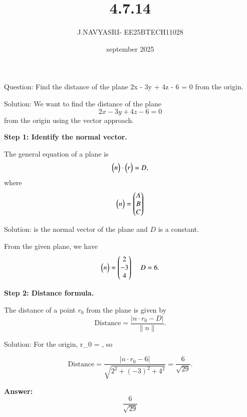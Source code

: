 \documentclass{beamer}
\title %
{4.7.14}
\date{september 2025}
\author %
{J.NAVYASRI- EE25BTECH11028}
\begin{document}
\frame{\titlepage}
\begin{frame}{Question:}
Find the distance of the plane 
2x - 3y + 4z - 6 = 0
from the origin.
\end{frame}

\begin{frame}{Solution:}
 We want to find the distance of the plane 
\begin{equation}
2x - 3y + 4z - 6 = 0
\end{equation} 
from the origin using the vector approach.

\textbf{Step 1: Identify the normal vector.}

The general equation of a plane is 
\begin{equation}
\begin{pmatrix}n\end{pmatrix} \cdot \begin{pmatrix}r\end{pmatrix} = D,
\end{equation}
where 
\begin{equation}
\begin{pmatrix}n\end{pmatrix} = \begin{pmatrix} A \\ B \\ C \end{pmatrix}
\end{equation} 
\end{frame}

\begin{frame}{Solution:}
is the normal vector of the plane and \(D\) is a constant. 

From the given plane, we have
\begin{equation}
\begin{pmatrix}n\end{pmatrix} = \begin{pmatrix} 2 \\ -3 \\ 4\end{pmatrix} \, \quad D = 6.
\end{equation}

\textbf{Step 2: Distance formula.}

The distance of a point \(r_0\) from the plane is given by
\begin{equation}
\text{Distance} = \frac{|{n} \cdot {r}_0 - D|}{\|{n}\|}.
\end{equation}
\end{frame}

\begin{frame}{Solution:}
For the origin, {r}_0 = , so

\begin{equation}
\text{Distance} = \frac{|n \cdot {r}_0 - 6|}{\sqrt{2^2 + (-3)^2 + 4^2}} 
= \frac{6}{\sqrt{29}}.
\end{equation}

\textbf{Answer:}
\begin{equation}
\boxed{\frac{6}{\sqrt{29}}}
\end{equation}
\end{frame}
\end{document}
